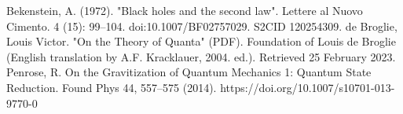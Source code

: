 \documentclass[12pt,a4paper]{article}
\begin{document}
\begin{thebibliography}{10}
 Bekenstein, A. (1972). "Black holes and the second law". Lettere al Nuovo Cimento. 4 (15): 99–104. doi:10.1007/BF02757029. S2CID 120254309.
 de Broglie, Louis Victor. "On the Theory of Quanta" (PDF). Foundation of Louis de Broglie (English translation by A.F. Kracklauer, 2004. ed.). Retrieved 25 February 2023.
 Penrose, R. On the Gravitization of Quantum Mechanics 1: Quantum State Reduction. Found Phys 44, 557–575 (2014). https://doi.org/10.1007/s10701-013-9770-0

\end{thebibliography}
\end{document}
